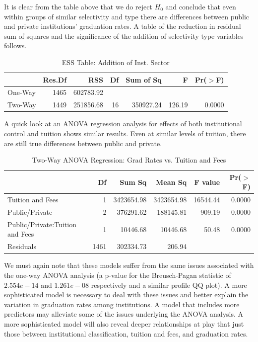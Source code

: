 \documentclass{article}
\begin{document}
It is clear from the table above that we do reject $H_0$ and conclude that even within groups of similar selectivity and type there are differences between public and private institutions' graduation rates. A table of the reduction in residual sum of squares and the significance of the addition of selectivity type variables follows.

\begin{table}[ht]
\centering
\footnotesize
\begin{tabular}{lrrrrrr}
  \hline
 & Res.Df & RSS & Df & Sum of Sq & F & Pr($>$F) \\ 
  \hline
One-Way & 1465 & 602783.92 &  &  &  &  \\ 
Two-Way & 1449 & 251856.68 & 16 & 350927.24 & 126.19 & 0.0000 \\ 
   \hline
\end{tabular}
\caption{ESS Table: Addition of Inst. Sector} 
\end{table}
\FloatBarrier

A quick look at an ANOVA regression analysis for effects of both institutional control and tuition shows similar results. Even at similar levels of tuition, there are still true differences between public and private.

\begin{table}[ht]
\centering
\footnotesize
\begin{tabular}{lrrrrr}
  \hline
 & Df & Sum Sq & Mean Sq & F value & Pr($>$F) \\ 
  \hline
Tuition and Fees & 1 & 3423654.98 & 3423654.98 & 16544.44 & 0.0000 \\ 
Public/Private & 2 & 376291.62 & 188145.81 & 909.19 & 0.0000 \\ 
Public/Private:Tuition and Fees & 1 & 10446.68 & 10446.68 & 50.48 & 0.0000 \\ 
  Residuals & 1461 & 302334.73 & 206.94 &  &  \\ 
   \hline
\end{tabular}
\caption{Two-Way ANOVA Regression: Grad Rates vs. Tuition and Fees}
\end{table}

We must again note that these models suffer from the same issues associated with the one-way ANOVA analysis (a p-value for the Breusch-Pagan statistic of $2.554e-14$ and $1.261e-08$ respectively and a similar profile QQ plot). A more sophisticated model is necessary to deal with these issues and better explain the variation in graduation rates among institutions. A model that includes more predictors may alleviate some of the issues underlying the ANOVA analysis. A more sophisticated model will also reveal deeper relationships at play that just those between institutional classification, tuition and fees, and graduation rates.
\end{document}
